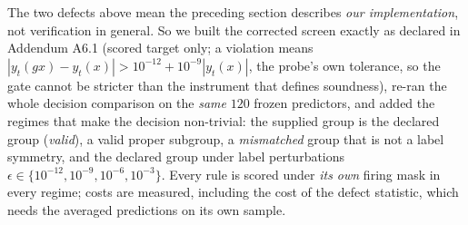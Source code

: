 \documentclass{neurips_2024}
\begin{document}
The two defects above mean the preceding section describes \emph{our implementation}, not
verification in general. So we built the corrected screen exactly as declared in Addendum A6.1
(scored target only; a violation means
$|y_t(gx)-y_t(x)| > 10^{-12} + 10^{-9}|y_t(x)|$, the probe's own tolerance, so the gate cannot
be stricter than the instrument that defines soundness), re-ran the whole decision comparison
on the \emph{same} $120$ frozen predictors, and added the regimes that make the decision
non-trivial: the supplied group is the declared group (\emph{valid}), a valid proper subgroup,
a \emph{mismatched} group that is not a label symmetry, and the declared group under label
perturbations $\epsilon \in \{10^{-12},10^{-9},10^{-6},10^{-3}\}$. Every rule is scored under
\emph{its own} firing mask in every regime; costs are measured, including the cost of the
defect statistic, which needs the averaged predictions on its own sample.
\end{document}
